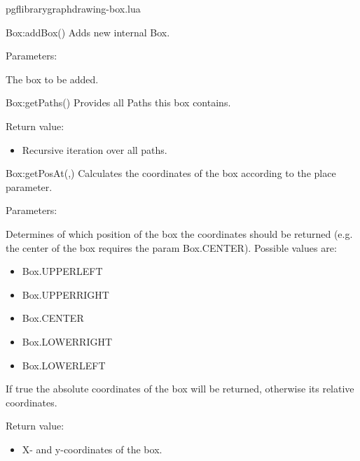 
\begin{filedescription}{pgflibrarygraphdrawing-box.lua}


\begin{luacommand}{{Box:addBox}()}
Adds new internal Box.

Parameters:
\begin{parameterdescription}
	\item[\meta{box}] The box to be added.
\end{parameterdescription}



\end{luacommand}\begin{luacommand}{{Box:getPaths}()}
Provides all Paths this box contains.


Return value:
\begin{itemize} \item[] Recursive iteration over all paths. \end{itemize}


\end{luacommand}\begin{luacommand}{{Box:getPosAt}(,)}
Calculates the coordinates of the box according to the place parameter.

Parameters:
\begin{parameterdescription}
	\item[\meta{place}] Determines of which position of the box the coordinates should be returned (e.g. the center of the box requires the param Box.CENTER).  Possible values are: \begin{itemize} \item Box.UPPERLEFT \item Box.UPPERRIGHT \item Box.CENTER \item Box.LOWERRIGHT \item Box.LOWERLEFT \end{itemize}\item[\meta{absolute}] If true the absolute coordinates of the box will be returned, otherwise its relative coordinates.
\end{parameterdescription}


Return value:
\begin{itemize} \item[] X- and y-coordinates of the box. \end{itemize}



\end{luacommand}
\end{filedescription}
